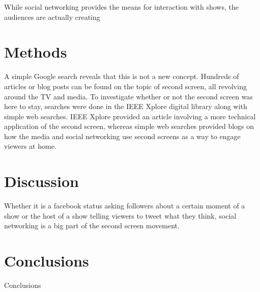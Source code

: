 \documentclass[11pt, oneside]{article}
\begin{document}
While social networking provides the means for interaction with shows, the audiences are actually creating 

\section{Methods}
A simple Google search reveals that this is not a new concept. Hundreds of articles or blog posts can be found on the topic of second screen, all revolving around the TV and media. To investigate whether or not the second screen was here to stay, searches were done in the IEEE Xplore digital library along with simple web searches. IEEE Xplore provided an article involving a more technical application of the second screen, whereas simple web searches provided blogs on how the media and social networking use second screens as a way to engage viewers at home. 

\section{Discussion}
Whether it is a facebook status asking followers about a certain moment of a show or the host of a show telling viewers to tweet what they think, social networking is a big part of the second screen movement. 

\section{Conclusions}
Conclusions

{}

\end{document}
